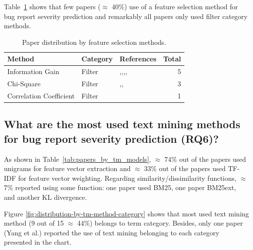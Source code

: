 Table~\ref{tab:features_selection_by_papers} shows that few papers ($\approx$ 40\%) use of a feature selection method for bug report severity prediction and remarkably all papers only used filter category methods.

\begin{table}[h!]
  \centering
  \captionsetup{type=table}
  \caption{Paper distribution by feature selection methods.}
  \begin{tabular}{@{}llp{6.0cm}r@{}}
    \toprule
    \textbf{Method} & \textbf{Category} & \textbf{References} & \textbf{Total} \\
    \midrule
    Information Gain & Filter & \cite{Yang:2012},\cite{Chaturvedi:2012},\cite{Sharma:2015},\cite{Tian:2016},\cite{Roy:2017} & 5 \\
    \midrule
    Chi-Square & Filter & \cite{Yang:2012},\cite{Roy:2014},\cite{Sharma:2015} & 3 \\
    \midrule
    Correlation Coefficient & Filter & \cite{Yang:2012} & 1 \\
    \bottomrule
  \end{tabular} 
  \label{tab:features_selection_by_papers}
\end{table}

\subsection{What are the most used text mining methods for bug report severity prediction (RQ6)?}\label{subsec:rq6_result}

As shown in Table~\ref{tab:papers_by_tm_models},  $\approx$ 74\% out of the papers used unigrams for feature vector extraction and $\approx$ 33\%  out of the papers used TF-IDF  for feature vector weighting. Regarding similarity/dissimilarity functions, $\approx$ 7\% reported using some function: one paper used BM25, one paper BM25ext, and another KL divergence.

Figure \ref{fig:distribution-by-tm-method-category} shows that most used text mining method (9 out of 15 $\approx$ 44\%) belongs to term category. Besides, only one paper (Yang et al.\cite{Yang:2017}) reported the use of text mining belonging to each category presented in the chart.

